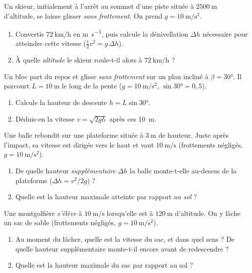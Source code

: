 \documentclass[11pt,a4paper]{article}
\begin{document}

\begin{exo}
Un skieur, initialement à l'arrêt au sommet d'une piste située à $\qty{2500}{\metre}$ d'altitude, se
laisse glisser \emph{sans frottement}. On prend $g=\qty{10}{\metre\per\second\squared}$.
\begin{enumerate}[label=\alph*)]
  \item Convertis $\qty{72}{\kilo\metre\per\hour}$ en \si{\metre\per\second}, puis calcule la
        dénivellation $\Delta h$ nécessaire pour atteindre cette vitesse ($\tfrac12 v^2=g\,\Delta h$).
  \item À quelle \emph{altitude} le skieur roule-t-il alors à $\qty{72}{\kilo\metre\per\hour}$ ?
\end{enumerate}
\end{exo}

\begin{exo}
Un bloc part du repos et glisse \emph{sans frottement} sur un plan incliné à $\beta=\ang{30}$. Il
parcourt $L=\qty{10}{\metre}$ le long de la pente ($g=\qty{10}{\metre\per\second\squared}$,
$\sin\ang{30}=0,5$).
\begin{enumerate}[label=\alph*)]
  \item Calcule la hauteur de descente $h=L\sin\ang{30}$.
  \item Déduis-en la vitesse $v=\sqrt{2gh}$ après ces \qty{10}{\metre}.
\end{enumerate}
\end{exo}

\begin{exo}
Une balle rebondit sur une plateforme située à $\qty{3}{\metre}$ de hauteur. Juste après l'impact, sa
vitesse est dirigée vers le haut et vaut $\qty{10}{\metre\per\second}$ (frottements négligés,
$g=\qty{10}{\metre\per\second\squared}$).
\begin{enumerate}[label=\alph*)]
  \item De quelle hauteur \emph{supplémentaire} $\Delta h$ la balle monte-t-elle au-dessus de la
        plateforme ($\Delta h=v^2/2g$) ?
  \item Quelle est la hauteur maximale atteinte par rapport au \emph{sol} ?
\end{enumerate}
\end{exo}

\begin{exo}
Une montgolfière \emph{s'élève} à $\qty{10}{\metre\per\second}$ lorsqu'elle est à $\qty{120}{\metre}$
d'altitude. On y lâche un sac de sable (frottements négligés, $g=\qty{10}{\metre\per\second\squared}$).
\begin{enumerate}[label=\alph*)]
  \item Au moment du lâcher, quelle est la vitesse du sac, et dans quel sens ? De quelle hauteur
        supplémentaire monte-t-il encore avant de redescendre ?
  \item Quelle est la hauteur maximale du sac par rapport au sol ?
\end{enumerate}
\end{exo}
\end{document}
